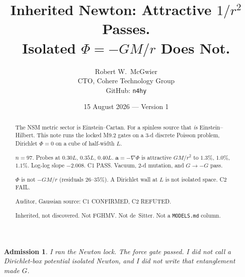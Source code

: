 \documentclass[11pt]{article}
\title{\textbf{Inherited Newton: Attractive $1/r^2$ Passes.\\
Isolated $\Phi=-GM/r$ Does Not.}}
\author{Robert W.\ McGwier\\
\small CTO, Cohere Technology Group\\
\small GitHub: \texttt{n4hy}}
\date{15 August 2026 --- Version 1}
\newtheorem*{admission}{Admission}
\begin{document}
\maketitle

\begin{abstract}
\noindent
The NSM metric sector is Einstein--Cartan. For a spinless
source that \emph{is} Einstein--Hilbert. This note runs the
locked M9.2 gates on a 3-d discrete Poisson problem,
Dirichlet $\Phi=0$ on a cube of half-width $L$.

$n=97$. Probes at $0.30L$, $0.35L$, $0.40L$.
$\mathbf{a}=-\nabla\Phi$ is attractive $GM/r^2$ to
$1.3\%$, $1.0\%$, $1.1\%$. Log-log slope $-2.008$.
C1 PASS. Vacuum, 2-d mutation, and $G\to -G$ pass.

$\Phi$ is not $-GM/r$ (residuals $26$--$35\%$). A
Dirichlet wall at $L$ is not isolated space. C2 FAIL.

Auditor, Gaussian source: C1 CONFIRMED, C2 REFUTED.

Inherited, not discovered. Not FGHMV. Not de~Sitter.
Not a \texttt{MODELS.md} column.
\end{abstract}

\begin{admission}
I ran the Newton lock. The force gate passed. I did not
call a Dirichlet-box potential isolated Newton, and I did
not write that entanglement made $G$.
\end{admission}
\end{document}
